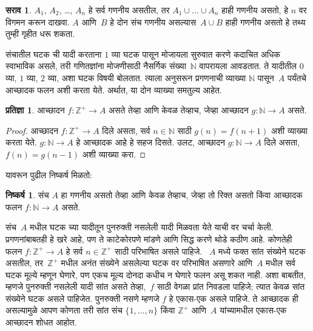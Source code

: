 \documentclass[11pt,a4paper,openany]{book}
\theoremstyle{definition}
\newtheorem{prop}[defn]{प्रतिज्ञा}
\newtheorem{prob}{सराव}[chapter]
\newcommand{\Nat}{\mathbb{N}}
\newcommand{\PosInt}{\mathbb{Z}^{+}}
\newtheorem{cor}[defn]{निष्कर्ष}
\begin{document}
\begin{prob}
  $A_1$, $A_2$, \dots, $A_n$ हे सर्व गणनीय असतील, तर
  $A_1 \cup \dots \cup A_n$ हाही गणनीय असतो, हे
  $n$ वर विगमन करून दाखवा. $A$ आणि~$B$ हे दोन संच
  गणनीय असल्यास~$A \cup B$ हाही गणनीय असतो
  हे तथ्य तुम्ही गृहीत धरू शकता.
\end{prob}

संचातील घटक ची यादी करताना $1$ व्या घटक पासून
मोजायला सुरुवात करणे कदाचित अधिक स्वाभाविक असले, तरी गणितज्ञांना
मोजणीसाठी नैसर्गिक संख्या~$\Nat$ वापरायला आवडतात. ते यादीतील
$0$ व्या, $1$ व्या, $2$ व्या, अशा घटक विषयी बोलतात.
त्याला अनुसरून प्रगणनाची व्याख्या $\Nat$ पासून~$A$ पर्यंतचे
आच्छादक फलन अशी करता येते. अर्थात, या दोन व्याख्या समतुल्य आहेत.

\begin{prop}\label{sfr:siz:enm:prop:enum-shift}
  आच्छादन $f\colon \PosInt \to A$ असते तेव्हा आणि
  केवळ तेव्हाच, जेव्हा आच्छादन $g\colon \Nat \to A$ असते.
\end{prop}

\begin{proof}
  आच्छादन $f\colon \PosInt \to A$ दिले असता, सर्व
  $n \in \Nat$ साठी $g(n) = f(n+1)$ अशी व्याख्या करता येते.
  $g\colon \Nat \to A$ हे आच्छादक आहे हे सहज दिसते.
  उलट, आच्छादन $g\colon \Nat \to A$ दिले असता,
  $f(n) = g(n-1)$ अशी व्याख्या करा.
\end{proof}

यावरून पुढील निष्कर्ष मिळतो:

\begin{cor}\label{sfr:siz:enm:cor:enum-nat}
संच $A$ हा गणनीय असतो तेव्हा आणि केवळ तेव्हाच, जेव्हा
तो रिक्त असतो किंवा आच्छादक फलन $f\colon \Nat \to A$ असते.
\end{cor}

संच~$A$ मधील घटक च्या यादीतून पुनरुक्ती नसलेली यादी
मिळवता येते याची वर चर्चा केली. प्रगणनांबाबतही हे खरे आहे,
पण ते काटेकोरपणे मांडणे आणि सिद्ध करणे थोडे कठीण आहे. कोणतेही
फलन $f\colon \PosInt \to A$ हे सर्व $n \in \PosInt$ साठी
परिभाषित असले पाहिजे. ~$A$ मध्ये फक्त सांत संख्येने घटक
असतील, तर~$\PosInt$ मधील अनंत संख्येने असलेल्या घटक
वर परिभाषित असणारे आणि~$A$ मधील सर्व घटक मूल्ये म्हणून
घेणारे, पण एकच मूल्य दोनदा कधीच न घेणारे फलन असू शकत नाही.
अशा बाबतीत, म्हणजे पुनरुक्ती नसलेली यादी सांत असते तेव्हा,~$f$
साठी वेगळा प्रांत निवडला पाहिजे; त्यात केवळ सांत संख्येने
घटक असले पाहिजेत. पुनरुक्ती नसणे म्हणजे $f$ हे
एकास-एक असले पाहिजे. ते आच्छादक ही असल्यामुळे
आपण कोणता तरी सांत संच $\{1, \dots, n\}$ किंवा $\PosInt$
आणि~$A$ यांच्यामधील एकास-एक आच्छादन शोधत आहोत.
\end{document}
